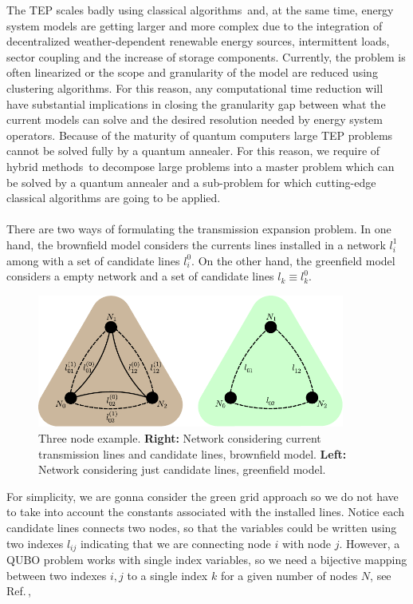 The TEP scales badly using classical algorithms\,\cite{Oertel2014ComplexityEvaluation} and, at the same time, energy system models are getting larger and more complex due to the integration of decentralized weather-dependent renewable energy sources, intermittent loads, sector coupling and the increase of storage components. Currently, the problem is often linearized or the scope and granularity of the model are reduced using clustering algorithms. For this reason, any computational time reduction will have substantial implications in closing the granularity gap between what the current models can solve and the desired resolution needed by energy system operators. Because of the maturity of quantum computers large TEP problems cannot be solved fully by a quantum annealer. For this reason, we require of hybrid methods\,\cite{Ding2019ImplementationDesign,Zhao2021HybridProgrammingb} to decompose large problems into a master problem which can be solved by a quantum annealer and a sub-problem for which cutting-edge classical algorithms are going to be applied.\\\\
There are two ways of formulating the transmission expansion problem. In one hand, the brownfield model considers the currents lines installed in a network $l_{i}^{1}$ among with a set of candidate lines $l_{i}^{0}$. On the other hand, the greenfield model considers a empty network and a set of candidate lines $l_{k} \equiv l_{k}^{0}$.
\begin{figure}[H]
  \begin{center}
\includegraphics[width=0.9\textwidth]{Figures/3NodeBrownGreen.pdf}
  \end{center}
  \caption{Three node example. \textbf{Right:} Network considering current transmission lines and candidate lines, brownfield model. \textbf{Left:} Network considering just candidate lines, greenfield model.}
  \label{fig: ThreeNode}
\end{figure}
For simplicity, we are gonna consider the green grid approach so we do not have to take into account the constants associated with the installed lines. Notice each candidate lines connects two nodes, so that the variables could be written using two indexes $l_{ij}$ indicating that we are connecting node $i$ with node $j$. However, a QUBO problem works with single index variables, so we need a bijective mapping between two indexes $i,j$ to a single index $k$ for a given number of nodes $N$, see Ref.\,\cite{Jain2021SolvingComputer},
